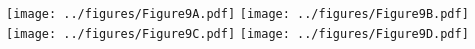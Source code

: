 \documentclass[class=minimal,border=0pt,varwidth]{standalone}
\begin{document}
\texttt{[image: ../figures/Figure9A.pdf]}
\texttt{[image: ../figures/Figure9B.pdf]}\\
\texttt{[image: ../figures/Figure9C.pdf]}
\texttt{[image: ../figures/Figure9D.pdf]}
\end{document}
